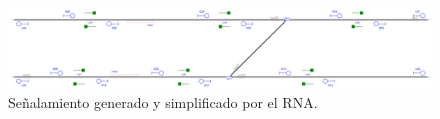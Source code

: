\lipsum[1]

 \begin{figure}[H]
	\centering
	\includegraphics[width=1\textwidth]{resultados-obtenidos/ejemplo8/images/8_RNA.png}
	\centering\caption{Señalamiento generado y simplificado por el RNA.}
\end{figure}

\lipsum[1]